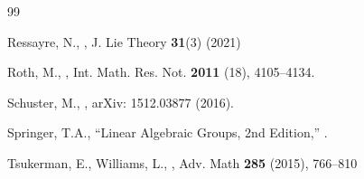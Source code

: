 \documentclass[12pt,reqno]{amsart}
\theoremstyle{definition}
\begin{document}
\begin{thebibliography}{99}
	
	
	


	
	
	
	Ressayre, N.,
	,
	\newblock J. Lie Theory {\bf 31}(3) (2021)
	
	
	Roth, M.,
	,
	\newblock Int. Math. Res. Not. {\bf 2011} (18), 4105--4134.
	
	
	
	Schuster, M.,
	,
	\newblock arXiv: 1512.03877 (2016).
	
	
	Springer, T.A.,
	\newblock``Linear Algebraic Groups, 2nd Edition,'' 
	.
	
	Tsukerman, E., Williams, L.,
	,
	\newblock Adv. Math {\bf 285} (2015), 766--810
	
\end{thebibliography}
\end{document}
